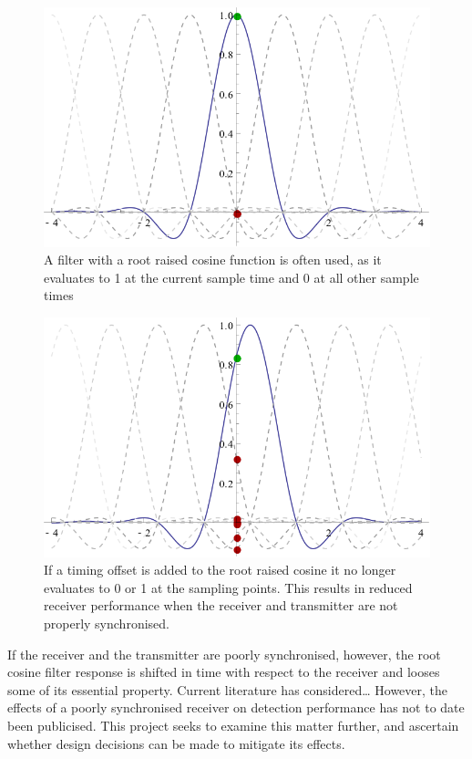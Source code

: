 \begin{figure}[htbp]
\centering
\includegraphics{rrc_sync.png}
\caption{A filter with a root raised cosine function is often used, as
it evaluates to 1 at the current sample time and 0 at all other sample
times}
\end{figure}

\begin{figure}[htbp]
\centering
\includegraphics{rrc_err.png}
\caption{If a timing offset is added to the root raised cosine it no
longer evaluates to 0 or 1 at the sampling points. This results in
reduced receiver performance when the receiver and transmitter are not
properly synchronised.}
\end{figure}

If the receiver and the transmitter are poorly synchronised, however,
the root cosine filter response is shifted in time with respect to the
receiver and looses some of its essential property. Current literature
has considered\ldots{} However, the effects of a poorly synchronised
receiver on detection performance has not to date been publicised. This
project seeks to examine this matter further, and ascertain whether
design decisions can be made to mitigate its effects.

